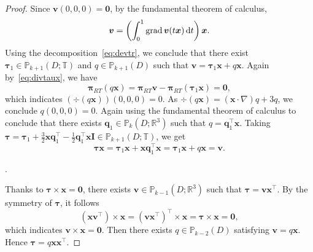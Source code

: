\begin{proof}
Since $\boldsymbol  v(0,0,0)=\boldsymbol 0$, by the fundamental theorem of calculus, $$\boldsymbol v = \left (\int_0^1 \operatorname{grad} \boldsymbol v( t \boldsymbol x) \,{\rm d} t \right )\boldsymbol x.$$ Using the decomposition~\eqref{eq:devtr}, we conclude that there exist $\boldsymbol \tau_1\in\mathbb P_{k+1}(D; \mathbb T)$ and $q\in\mathbb P_{k+1}(D)$ such that
$\boldsymbol  v=\boldsymbol \tau_1\boldsymbol x+q\boldsymbol x$. 
Again by~\eqref{eq:divtaux}, we have
$$
\boldsymbol\pi_{RT}(q\boldsymbol x)=\boldsymbol\pi_{RT}\boldsymbol v-\boldsymbol\pi_{RT}(\boldsymbol \tau_1\boldsymbol x)=\boldsymbol 0,
$$
which indicates $(\div(q\boldsymbol  x))(0,0,0)=0$. As $\div(q\boldsymbol  x )=(\boldsymbol x\cdot\nabla)q+3q$, we conclude $q(0,0,0)=0$. Again using the fundamental theorem of calculus to conclude that there exists $\boldsymbol  q_1\in\mathbb P_{k}(D; \mathbb R^3)$ such that $q=\boldsymbol  q_1^{\intercal}\boldsymbol x$.
Taking $\boldsymbol \tau=\boldsymbol \tau_1+\frac{3}{2}\boldsymbol  x\boldsymbol  q_1^{\intercal}-\frac{1}{2}\boldsymbol  q_1^{\intercal}\boldsymbol  x\boldsymbol  I\in\mathbb P_{k+1}(D; \mathbb T)$, we get
\[
\boldsymbol \tau\boldsymbol x=\boldsymbol \tau_1\boldsymbol x+\boldsymbol  x\boldsymbol  q_1^{\intercal}\boldsymbol x=\boldsymbol \tau_1\boldsymbol x+q\boldsymbol x=\boldsymbol  v.
\]

\medskip
{}. 
 
Thanks to $\boldsymbol \tau\times\boldsymbol x=\boldsymbol 0$, there exists $\boldsymbol v\in \mathbb P_{k-1}(D; \mathbb R^3)$ such that $\boldsymbol \tau=\boldsymbol  v\boldsymbol  x^{\intercal}$. By the symmetry of $\boldsymbol \tau$, it follows
\[
(\boldsymbol x\boldsymbol v^{\intercal})\times\boldsymbol x=(\boldsymbol  v\boldsymbol  x^{\intercal})^{\intercal}\times\boldsymbol x=\boldsymbol \tau\times\boldsymbol x=\boldsymbol 0,
\]
which indicates $\boldsymbol v\times\boldsymbol x=\boldsymbol 0$. Then there exists $q\in\mathbb P_{k-2}(D)$ satisfying $\boldsymbol  v=q\boldsymbol  x$.
Hence $\boldsymbol \tau=q\boldsymbol x\boldsymbol  x^{\intercal}$. 


\end{proof}
